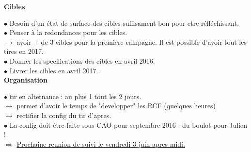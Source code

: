 \documentclass{report}
\begin{document}
\noindent
{\bf Cibles}

\noindent $\bullet$ Besoin d'un état de surface des cibles suffisament bon pour etre réfléchissant.\\
\noindent $\bullet$ Penser à la redondances pour les cibles.\\
\noindent $\rightarrow$ avoir + de 3 cibles pour la premiere campagne. Il est possible d'avoir tout les tires en 2017.\\
\noindent $\bullet$ Donner les specifications des cibles en avril 2016.\\
\noindent $\bullet$ Livrer les cibles en avril 2017.\\


\noindent
{\bf Organisation}

\noindent $\bullet$ tir en alternance : au plus 1 tout les 2 jours.\\
\noindent $\rightarrow$ permet d'avoir le temps de "developper" les RCF (quelques heures)\\
\noindent $\rightarrow$ rectifier la config du tir d'apres.\\
\noindent $\bullet$ La config doit être faite sous CAO pour septembre 2016 : du boulot pour Julien !\\

\noindent $\Rightarrow$ \underline{Prochaine reunion de suivi le vendredi 3 juin apres-midi.}\\
\end{document}
